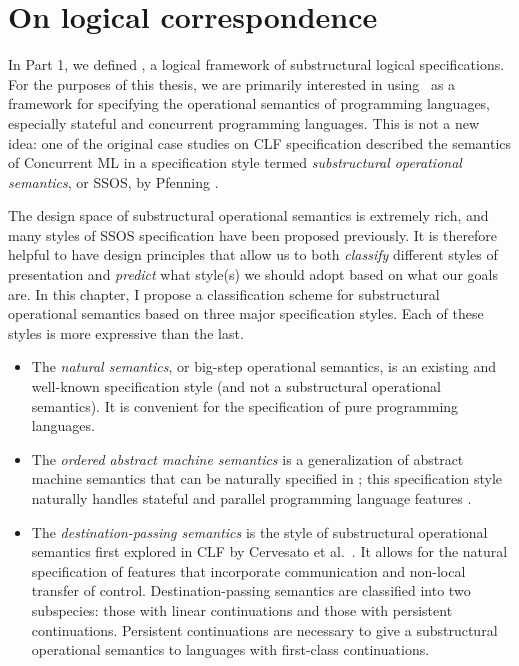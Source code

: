\chapter{On logical correspondence}
\label{chapter-correspondence}

In Part 1, we defined \sls, a logical framework of substructural
logical specifications. For the purposes of this thesis, we are
primarily interested in using \sls~as a framework for specifying the
operational semantics of programming languages, especially stateful
and concurrent programming languages. This is not a new idea: one of
the original case studies on CLF specification described the semantics
of Concurrent ML \cite{cervesato02concurrent} in a specification style
termed {\it substructural operational semantics}, or SSOS, by Pfenning
\cite{pfenning04substructural}. 

The design space of substructural operational semantics is extremely
rich, and many styles of SSOS specification have been proposed
previously. It is therefore helpful to have design principles that
allow us to both {\it classify} different styles of presentation and
{\it predict} what style(s) we should adopt based on what our goals
are. In this chapter, I propose a classification scheme for
substructural operational semantics based on three major specification
styles.  Each of these styles is more expressive than the last.

\begin{itemize}
\item The {\it natural semantics}, or big-step operational semantics,
  is an existing and well-known specification style (and not a
  substructural operational semantics). It is convenient for the
  specification of pure programming languages.

\item The {\it ordered abstract machine semantics} is a generalization
  of abstract machine semantics that can be naturally specified in
  \sls; this specification style naturally handles stateful and
  parallel programming language features
  \cite{pfenning09substructural}.

\item The {\it destination-passing semantics} is the style of
  substructural operational semantics first explored in CLF by
  Cervesato et al.~\cite{cervesato02concurrent}. It allows for the
  natural specification of features that incorporate 
  communication and non-local transfer of control. Destination-passing
  semantics are classified into two subspecies: those with linear
  continuations and those with persistent continuations. Persistent
  continuations are necessary to give a substructural operational
  semantics to languages with first-class continuations.
\end{itemize}


